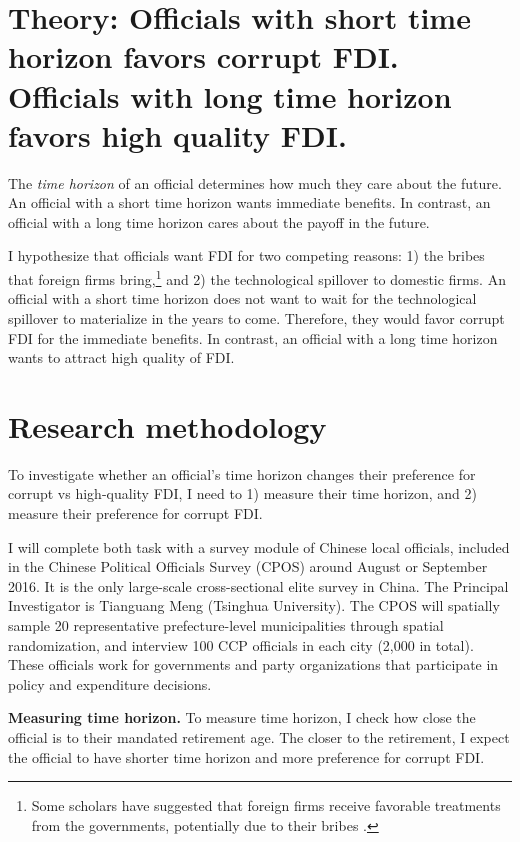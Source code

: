 \documentclass[12pt]{article}
\begin{document}
\section{Theory: Officials with short time horizon favors corrupt FDI. Officials with long time horizon favors high quality FDI.}

The \textit{time horizon} of an official determines how much they care about the future. An official with a short time horizon wants immediate benefits. In contrast, an official with a long time horizon cares about the payoff in the future.

I hypothesize that officials want FDI for two competing reasons: 1) the bribes that foreign firms bring,\footnote{Some scholars have suggested that foreign firms receive favorable treatments from the governments, potentially due to their bribes \citep{Huang2011}.} and 2) the technological spillover to domestic firms. An official with a short time horizon does not want to wait for the technological spillover to materialize in the years to come. Therefore, they would favor corrupt FDI for the immediate benefits. In contrast, an official with a long time horizon wants to attract high quality of FDI.

\section{Research methodology}

To investigate whether an official's time horizon changes their preference for corrupt vs high-quality FDI, I need to 1) measure their time horizon, and 2) measure their preference for corrupt FDI.

I will complete both task with a survey module of Chinese local officials, included in the Chinese Political Officials Survey (CPOS) around August or September 2016. It is the only large-scale cross-sectional elite survey in China. The Principal Investigator is Tianguang Meng (Tsinghua University). The CPOS will spatially sample 20 representative prefecture-level municipalities through spatial randomization, and interview 100 CCP officials in each city (2,000 in total). These officials work for governments and party organizations that participate in policy and expenditure decisions.

\textbf{Measuring time horizon.} To measure time horizon, I check how close the official is to their mandated retirement age. The closer to the retirement, I expect the official to have shorter time horizon and more preference for corrupt FDI.
\end{document}
